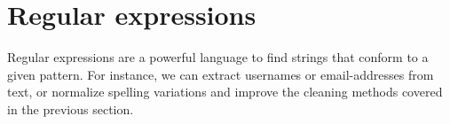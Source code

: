 \section{Regular expressions}
\label{sec:regular}

Regular expressions are a powerful language to find strings that conform to a given pattern. For instance, we can extract usernames or email-addresses from text, or normalize spelling variations and improve the cleaning methods covered in the previous section.